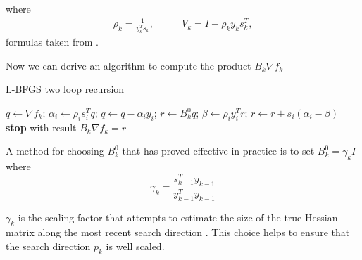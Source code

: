 where
\begin{align}
\rho_{k}= \frac{1}{y^T_{k}s_{k}}, & \qquad
V_{k} = I - \rho_{k} y_{k}s^T_{k},
\end{align}
formulas taken from \cite{numerical}.

Now we can derive an algorithm to compute the product $B_{k}\nabla f_{k}$

\begin{algorithm}[H]
	\caption{L-BFGS two loop recursion}
	\label{}
	\begin{algorithmic}[3]
	
		\State $q \gets \nabla f_{k}$;
        \State $ \alpha_{i} \gets \rho_{i}s^T_{i}q$;
        \State $q \gets q - \alpha_{i}y_{i}$; 
      \EndFor
 	  \State $r \gets B^0_{k}q$;
 	  \State $\beta \gets \rho_{i}y^T_{i}r$; 
 	  \State $r \gets r + s_{i}(\alpha_{i}-\beta)$
 	  \EndFor
	  \State \textbf{stop} with result $B_{k}\nabla f_{k}=r$
	\end{algorithmic}
\end{algorithm}


A method for choosing $B^0_{k}$ that has proved effective in practice is to set $B^0_{k}=\gamma_{k}I$  where 
\begin{equation}
\gamma_{k}= \frac{s^T_{k-1}y_{k-1}}{y^T_{k-1}y_{k-1}}
\end{equation}

$\gamma_{k}$ is the scaling factor that attempts to estimate the size of the true Hessian matrix along the most recent search direction \cite{numerical}. This choice helps to ensure that the search direction $p_{k}$ is well scaled.


